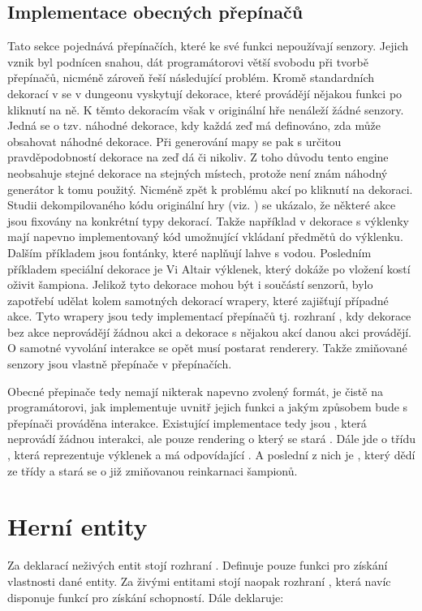 \subsection{Implementace obecných přepínačů}
Tato sekce pojednává přepínačích, které ke své funkci nepoužívají senzory. Jejich vznik byl podnícen snahou, dát
programátorovi větší svobodu při tvorbě přepínačů, nicméně zároveň řeší následující problém. Kromě standardních
dekorací v se v dungeonu vyskytují dekorace, které provádějí nějakou funkci po kliknutí na ně. K těmto dekoracím však v originální
hře nenáleží žádné senzory. Jedná se o tzv. náhodné dekorace, kdy každá zeď má definováno, zda může obsahovat náhodné dekorace.
Při generování mapy se pak s určitou pravděpodobností dekorace na zeď dá či nikoliv. Z toho důvodu tento engine
neobsahuje stejné dekorace na stejných místech, protože není znám náhodný generátor k tomu použitý. Nicméně zpět 
k problému akcí po kliknutí na dekoraci. Studii dekompilovaného kódu originální hry  (viz. \citet{DMDekompilation}) se ukázalo,
že některé akce jsou fixovány na konkrétní typy dekorací. Takže například v dekorace s výklenky mají napevno implementovaný 
kód umožnující vkládaní předmětů do výklenku. Dalším příkladem jsou fontánky, které naplňují lahve s vodou. Posledním příkladem
speciální dekorace je Vi Altair výklenek, který dokáže po vložení kostí oživit šampiona. Jelikož tyto dekorace
mohou být i součástí senzorů, bylo zapotřebí udělat kolem samotných dekorací wrapery, které zajišťují případné akce.
Tyto wrapery jsou tedy implementací přepínačů tj. rozhraní , kdy dekorace bez akce neprovádějí žádnou akci a dekorace s nějakou akcí
danou akci provádějí. O samotné vyvolání interakce se opět musí postarat renderery. Takže zmiňované senzory jsou vlastně přepínače v přepínačích. 

Obecné přepinače tedy nemají nikterak napevno zvolený formát, je čistě na programátorovi, jak implementuje uvnitř jejich funkci a 
jakým způsobem bude s přepínači prováděna interakce. Existující implementace tedy jsou , která
neprovádí žádnou interakci, ale pouze rendering o který se stará . Dále jde o třídu ,
která reprezentuje výklenek a má odpovídající . A poslední z nich je , který dědí
ze třídy  a stará se o již zmiňovanou reinkarnaci šampionů.
 
\section{Herní entity}
Za deklarací neživých entit stojí rozhraní . Definuje pouze funkci pro získání vlastnosti dané entity.
Za živými entitami stojí naopak rozhraní , která navíc disponuje funkcí pro získání schopností. Dále
deklaruje:

